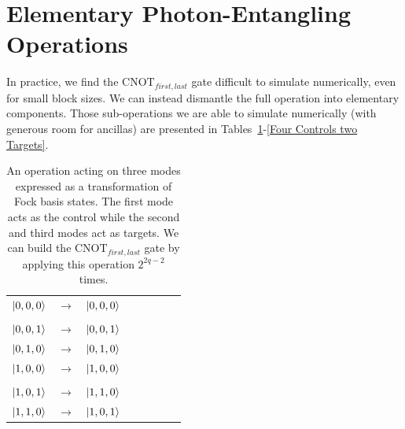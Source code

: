 \documentclass[aps,pra,twocolumn,showpacs,superscriptaddress,floatfix,10pt]{revtex4}
\begin{document}
\section{Elementary Photon-Entangling Operations}
\label{Section Elementary Photon Entangling Operations}
In practice, we find the $\mbox{CNOT}_{first,last}$ gate difficult to simulate numerically, even for small block sizes. We can instead dismantle the full operation into elementary components. Those sub-operations we are able to simulate numerically (with generous room for ancillas) are presented in Tables~\ref{One Control Two Targets}-\ref{Four Controls two Targets}.
\begin {table}[h]
\begin{center}
	\begin{tabular}{l*{6}{c}r} 
		$\ket{0,0,0}$  &  $\rightarrow$ & $\ket{0,0,0}$ \\ \\
		$\ket{0,0,1}$  & $\rightarrow$ & $\ket{0,0,1}$ \\
		$\ket{0,1,0}$ & $\rightarrow$ & $\ket{0,1,0}$ \\
		$\ket{1,0,0}$ & $\rightarrow$ & $\ket{1,0,0} $ \\ \\
		$\ket{1,0,1}$ & $\rightarrow$ & $\ket{1,1,0}$ \\
		$\ket{1,1,0}$ & $\rightarrow$ & $\ket{1,0,1}$ \\
	\end{tabular}
	\caption{ \label{One Control Two Targets} An operation acting on three modes expressed as a transformation of Fock basis states. The first mode acts as the control while the second and third modes act as targets. We can build the $\mbox{CNOT}_{first,last}$ gate by applying this operation $2^{2 q -2}$ times.}
\end{center}
\end{table}
\end{document}
